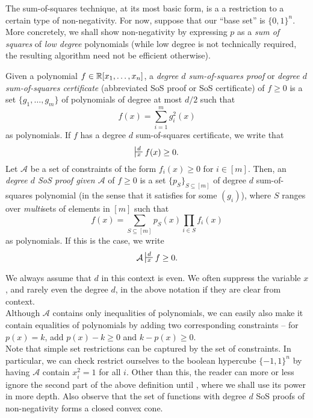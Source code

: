 	The sum-of-squares technique, at its most basic form, is a a restriction to a certain type of non-negativity. For now, suppose that our ``base set'' is $\{0,1\}^n$. \\
	More concretely, we shall show non-negativity by expressing $p$ as a \emph{sum of squares} of \emph{low degree} polynomials (while low degree is not technically required, the resulting algorithm need not be efficient otherwise).
	\begin{fdef}
		\label{def:sos}
		Given a polynomial $f \in \mathbb{R}[x_1,\ldots,x_n]$, a \emph{degree $d$ sum-of-squares proof} or \emph{degree $d$ sum-of-squares certificate} (abbreviated SoS proof or SoS certificate) of $f \ge 0$ is a set $\{g_1,\ldots,g_m\}$ of polynomials of degree at most $d/2$ such that
		\begin{equation}
			\label{eqn: base-sos}
			f(x) = \sum_{i=1}^m g_i^2(x)
		\end{equation}
		as polynomials.
		If $f$ has a degree $d$ sum-of-squares certificate, we write that
		\[ \sststile{x}{d} f(x) \ge 0. \]
		Let $\mathcal{A}$ be a set of constraints of the form $f_i(x) \ge 0$ for $i \in [m]$. Then, an \emph{degree $d$ SoS proof given $\mathcal{A}$} of $f \ge 0$ is a set $\{p_S\}_{S \subseteq [m]}$ of degree $d$ sum-of-squares polynomial (in the sense that it satisfies  for some $(g_i)$), where $S$ ranges over \emph{multi}sets of elements in $[m]$ such that
		\[ f(x) = \sum_{S \subseteq [m]} p_S(x) \prod_{i \in S} f_i(x) \]
		as polynomials. If this is the case, we write
		\[ \mathcal{A} \sststile{x}{d} f \ge 0. \]
	\end{fdef}
	We always assume that $d$ in this context is even. We often suppress the variable $x$, and rarely even the degree $d$, in the above notation if they are clear from context. \\
	Although $\mathcal{A}$ contains only inequalities of polynomials, we can easily also make it contain equalities of polynomials by adding two corresponding constraints -- for $p(x) = k$, add $p(x)-k \ge 0$ and $k-p(x) \ge 0$. \\

	Note that simple set restrictions can be captured by the set of constraints. In particular, we can check restrict ourselves to the boolean hypercube $\{-1,1\}^n$ by having $\mathcal{A}$ contain $x_i^2 = 1$ for all $i$. Other than this, the reader can more or less ignore the second part of the above definition until , where we shall use its power in more depth.
	Also observe that the set of functions with degree $d$ SoS proofs of non-negativity forms a closed convex cone.

